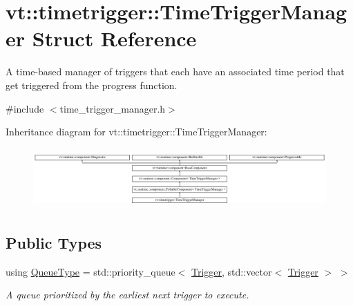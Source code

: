 \hypertarget{structvt_1_1timetrigger_1_1_time_trigger_manager}{}\section{vt\+:\+:timetrigger\+:\+:Time\+Trigger\+Manager Struct Reference}
\label{structvt_1_1timetrigger_1_1_time_trigger_manager}


A time-\/based manager of triggers that each have an associated time period that get triggered from the progress function.  




{\ttfamily \#include $<$time\+\_\+trigger\+\_\+manager.\+h$>$}

Inheritance diagram for vt\+:\+:timetrigger\+:\+:Time\+Trigger\+Manager\+:\begin{figure}[H]
\begin{center}
\leavevmode
\includegraphics[height=2.333333cm]{structvt_1_1timetrigger_1_1_time_trigger_manager}
\end{center}
\end{figure}
\subsection*{Public Types}
\begin{DoxyCompactItemize}
\item 
using \hyperlink{structvt_1_1timetrigger_1_1_time_trigger_manager_ad5dc7eeeb4b0d12a5582544d8f0a08c8}{Queue\+Type} = std\+::priority\+\_\+queue$<$ \hyperlink{structvt_1_1timetrigger_1_1_trigger}{Trigger}, std\+::vector$<$ \hyperlink{structvt_1_1timetrigger_1_1_trigger}{Trigger} $>$ $>$
\begin{DoxyCompactList}\small\item\em A queue prioritized by the earliest next trigger to execute. \end{DoxyCompactList}\end{DoxyCompactItemize}
